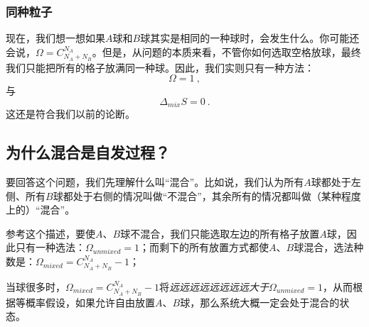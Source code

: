 \subsubsection{同种粒子}
现在，我们想一想如果$A$球和$B$球其实是相同的一种球时，会发生什么。你可能还会说，$\Omega = C^{N_A}_{N_A+N_B}$。但是，从问题的本质来看，不管你如何选取空格放球，最终我们只能把所有的格子放满同一种球。因此，我们实则只有一种方法：
\begin{equation}
\Omega = 1~,
\end{equation}
与
\begin{equation}
\Delta_{mix} S = 0~.
\end{equation}
这还是符合我们以前的论断。

\subsection{为什么混合是自发过程？}
要回答这个问题，我们先理解什么叫“混合”。比如说，我们认为所有$A$球都处于左侧、所有$B$球都处于右侧的情况叫做“不混合”，其余所有的情况都叫做（某种程度上的）“混合”。

参考这个描述，要使$A$、$B$球不混合，我们只能选取左边的所有格子放置$A$球，因此只有一种选法：$\Omega_{unmixed} = 1$；而剩下的所有放置方式都使$A$、$B$球混合，选法种数是：$\Omega_{mixed} =  C^{N_A}_{N_A+N_B} - 1$；

当球很多时，$\Omega_{mixed} = C^{N_A}_{N_A+N_B} - 1$将\textsl{远远远远远远远远大于}$\Omega_{unmixed} = 1$，从而根据等概率假设，如果允许自由放置$A$、$B$球，那么系统大概一定会处于混合的状态。
